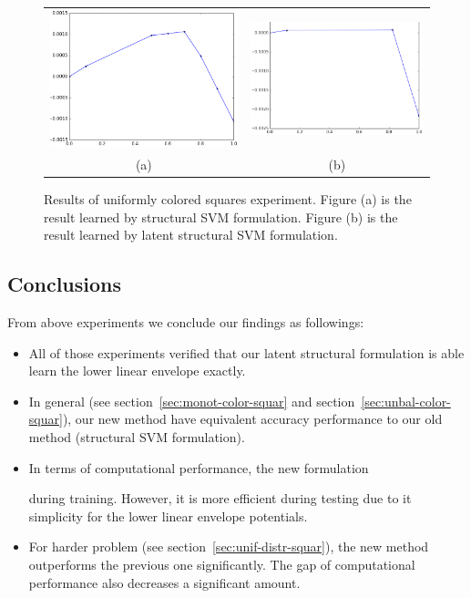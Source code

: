 \begin{figure}[h]
  \centering
  \setlength{\tabcolsep}{2pt}
  \begin{tabular}{cc}
    \includegraphics[width=0.5\columnwidth]{Part2/figures/ba_res_old.png}&
                                                                            \includegraphics[width=0.55\columnwidth]{Part2/figures/ba_res_new.png}\\
    {\small (a)} & {\small (b)} 
  \end{tabular}
  \caption{\label{fig:ba_res} Results of uniformly colored
    squares experiment. Figure (a) is the result learned by
    structural SVM formulation. Figure (b) is the result learned
    by latent structural SVM formulation.}
\end{figure}

\subsection{Conclusions}
\label{sec:synth-check-conc}

From above experiments we conclude our findings as followings:

\begin{itemize}
\item All of those experiments verified that our latent
  structural formulation is able learn the lower linear envelope
  exactly.
\item In general (see section~\ref{sec:monot-color-squar} and
  section~\ref{sec:unbal-color-squar}), our new method have
  equivalent accuracy performance to our old method (structural
  SVM formulation\cite{Gould:ICML2011,gouldlearning}).
\item In terms of computational performance, the new formulation

  during training. However, it is more efficient during testing
  due to it simplicity for the lower linear envelope potentials.
\item For harder problem (see
  section~\ref{sec:unif-distr-squar}), the new method outperforms
  the previous one significantly. The gap of computational
  performance also decreases a significant amount.
\end{itemize}

